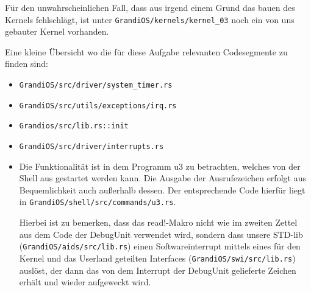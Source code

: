 \begin{description}
Für den unwahrscheinlichen Fall, dass aus irgend einem Grund das bauen des Kernels fehlschlägt, ist unter {\texttt{GrandiOS/kernels/kernel\_03}} noch ein von uns gebauter Kernel vorhanden.

Eine kleine Übersicht wo die für diese Aufgabe relevanten Codesegmente zu finden sind:
\begin{itemize}
	\item \texttt{GrandiOS/src/driver/system\_timer.rs}
	\item \texttt{GrandiOS/src/utils/exceptions/irq.rs}
	\item \texttt{Grandios/src/lib.rs::init}
	\item \texttt{GrandiOS/src/driver/interrupts.rs}
        \item Die Funktionalität ist in dem Programm u3 zu betrachten, welches von der Shell aus gestartet werden kann. Die Ausgabe der Ausrufezeichen erfolgt aus Bequemlichkeit auch außerhalb dessen. Der entsprechende Code hierfür liegt in \texttt{GrandiOS/shell/src/commands/u3.rs}.
          
          Hierbei ist zu bemerken, dass das read!-Makro nicht wie im zweiten Zettel aus dem Code der DebugUnit verwendet wird, sondern dass unsere STD-lib (\texttt{GrandiOS/aids/src/lib.rs}) einen Softwareinterrupt mittels eines für den Kernel und das Userland geteilten Interfaces (\texttt{GrandiOS/swi/src/lib.rs}) auslöst, der dann das von dem Interrupt der DebugUnit gelieferte Zeichen erhält und wieder aufgeweckt wird.
\end{itemize}

\end{description}


